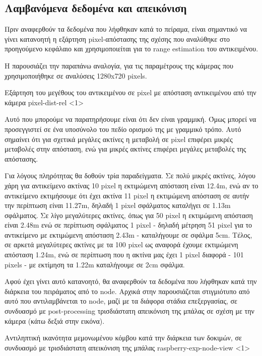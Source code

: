 \subsection{Λαμβανόμενα δεδομένα και απεικόνιση} \label{sec:expe-single-3d}

Πριν αναφερθούν τα δεδομένα που λήφθηκαν κατά το πείραμα, είναι σημαντικό να γίνει κατανοητή η εξάρτηση pixel-απόστασης της σχέσης  που αναλύθηκε στο προηγούμενο κεφάλαιο και χρησιμοποιείται για το range estimation του αντικειμένου.

Η  παρουσιάζει την παραπάνω αναλογία, για τις παραμέτρους της κάμερας που χρησιμοποιήθηκε σε αναλύσεις 1280x720 pixels.

{Εξάρτηση του μεγέθους του αντικειμένου σε pixel με απόσταση αντικειμένου από την κάμερα}%
{pixel-dist-rel}%
<1>

Αυτό που μπορούμε να παρατηρήσουμε είναι ότι δεν είναι γραμμική. Όμως μπορεί να προσεγγιστεί σε ένα υποσύνολο του πεδίο ορισμού της με γραμμικό τρόπο. Αυτό σημαίνει ότι για σχετικά μεγάλες ακτίνες η μεταβολή σε pixel επιφέρει μικρές με\-τα\-βο\-λές στην απόσταση, ενώ για μικρές ακτίνες επιφέρει μεγάλες μεταβολές της απόστασης. 

Για λόγους πληρότητας θα δοθούν τρία παραδείγματα. Σε πολύ μικρές ακτίνες, λόγου χάρη για αντικείμενο ακτίνας 10 pixel η εκτιμώμενη απόσταση είναι 12.4m, ενώ αν το αντικείμενο εκτιμήσουμε ότι έχει ακτίνα 11 pixel η εκτιμώμενη απόσταση σε αυτήν την περίπτωση είναι 11.27m, δηλαδή 1 pixel σφάλματος καταλήγει σε 1.13m σφάλματος. Σε λίγο μεγαλύτερες ακτίνες, όπως για 50 pixel η εκτιμώμενη απόσταση είναι 2.48m ενώ σε περίπτωση σφάλματος 1 pixel - δηλαδή μέτρηση 51 pixel για το αντικείμενο με εκτιμώμενη απόσταση 2.43m - καταλήγουμε σε σφάλμα 5cm. Τέλος, σε αρκετά μεγαλύτερες ακτίνες με τα 100 pixel ως αναφορά έχουμε εκτιμώμενη απόσταση 1.24m, ενώ σε περίπτωση που η ακτίνα μας έχει 1 pixel διαφορά - 101 pixels - με εκτίμηση τα 1.22m καταλήγουμε σε 2cm σφάλμα. 

Αφού έχει γίνει αυτό κατανοητό, θα αναφερθούν τα δεδομένα που λήφθηκαν κατά την διάρκεια του πειράματος από το node.
Αρχικά στην  παρουσιάζεται στιγμιότυπο από αυτό που αντιλαμβάνεται 
το node, μαζί με τα διάφορα στάδια ε\-πε\-ξε\-ργα\-σίας, σε συνδυασμό με post-processing τρισδιάστατη απεικόνιση 
της μπάλας σε σχέση με την κάμερα (κάτω δεξιά στην εικόνα).

{Αντιληπτική ικανότητα μεμονωμένου κόμβου κατά την διάρκεια των δοκιμών, σε συνδυασμό με τρισδιάστατη απεικόνιση της μπάλας}%
{raspberry-exp-node-view}%
<1>


